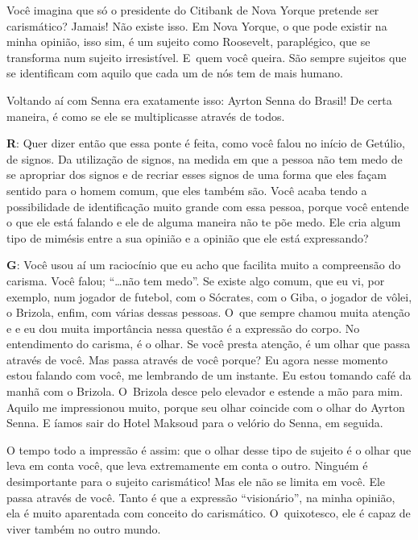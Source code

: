Você imagina que só o presidente do Citibank de Nova Yorque pretende ser
carismático? Jamais! Não existe isso. Em Nova Yorque, o que pode existir
na minha opinião, isso sim, é um sujeito como Roosevelt, paraplégico,
que se transforma num sujeito irresistível. E~quem você queira. São
sempre sujeitos que se identificam com aquilo que cada um de nós tem
de mais humano.

 

Voltando aí com Senna era exatamente isso: Ayrton Senna do Brasil! De
certa maneira, é como se ele se multiplicasse através de todos.

 

\textbf{R}: Quer dizer então que essa ponte é feita, como você falou no
início de Getúlio, de signos. Da utilização de signos, na medida em que
a pessoa não tem medo de se apropriar dos signos e de recriar esses
signos de uma forma que eles façam sentido para o homem comum, que eles
também são. Você acaba tendo a possibilidade de identificação muito
grande com essa pessoa, porque você entende o que ele está falando e ele
de alguma maneira não te põe medo. Ele cria algum tipo de mimésis entre
a sua opinião e a opinião que ele está expressando?

 

\textbf{G}: Você usou aí um raciocínio que eu acho que facilita muito a
compreensão do carisma. Você falou; ``…não tem medo''. Se existe
algo comum, que eu vi, por exemplo, num jogador de futebol, com o Sócrates,
com o Giba, o jogador de vôlei, o Brizola, enfim, com várias dessas
pessoas. O~que sempre chamou muita atenção e e eu dou muita importância
nessa questão é a expressão do corpo. No entendimento do carisma, é o
olhar. Se você presta atenção, é um olhar que passa através de você. Mas
passa através de você porque? Eu agora nesse momento estou falando com
você, me lembrando de um instante. Eu estou tomando café da manhã com o
Brizola. O~Brizola desce pelo elevador e estende a mão para mim. Aquilo
me impressionou muito, porque seu olhar coincide com o olhar do Ayrton
Senna. E íamos sair do Hotel Maksoud para o velório do Senna, em seguida.

 

O tempo todo a impressão é assim: que o olhar desse tipo de sujeito é
o olhar que leva em conta você, que leva extremamente em conta o outro.
Ninguém é desimportante para o sujeito carismático! Mas ele não se limita em você.
Ele passa através de você. Tanto é que a expressão ``visionário'', na
minha opinião, ela é muito aparentada com conceito do carismático. O~quixotesco, ele é capaz de viver também no outro mundo.


